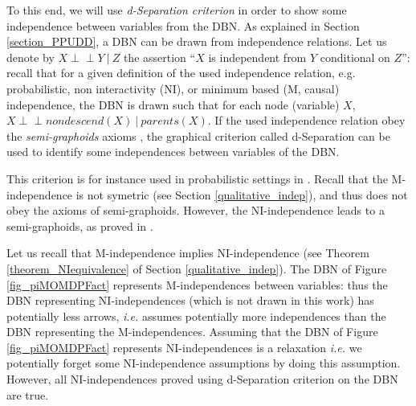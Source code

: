 To this end, we will use \textit{d-Separation criterion} \cite{pearl88} 
in order to show some independence between variables from the DBN.
As explained in Section \ref{section_PPUDD}, 
a DBN can be drawn from independence relations.
Let us denote by $X \perp\!\!\!\perp Y \ \vert \ Z$
the assertion ``$X$ is independent from $Y$ conditional on $Z$'':
recall that for a given definition of the used independence relation,
e.g. probabilistic, non interactivity (NI), or minimum based (M, causal) independence,
the DBN is drawn such that for each node (variable) $X$,
$X \perp\!\!\!\perp nondescend(X) \ \vert \ parents(X)$.
If the used independence relation obey the \textit{semi-graphoids} axioms \cite{Pearl:1988:PRI:52121,DBLP:journals/corr/abs-1304-2379},
the graphical criterion called d-Separation 
can be used to identify some independences between variables of the DBN.

This criterion is for instance used in probabilistic settings in \cite{Witwicki13icaps}.
Recall that the M-independence is not symetric (see Section \ref{qualitative_indep}),
and thus does not obey the axioms of semi-graphoids.
However, the NI-independence leads to a semi-graphoids,
as proved in \cite{delafonk}.

Let us recall that M-independence implies NI-independence
(see Theorem \ref{theorem_NIequivalence} of Section \ref{qualitative_indep}).
The DBN of Figure \ref{fig_piMOMDPFact}
represents M-independences between variables:
thus the DBN representing NI-independences (which is not drawn in this work) 
has potentially less arrows,
\textit{i.e.} assumes potentially more independences 
than the DBN representing the M-independences.
Assuming that the DBN of Figure \ref{fig_piMOMDPFact} 
represents NI-independences is a relaxation
\textit{i.e.} we potentially forget some NI-independence assumptions
by doing this assumption.
However, all NI-independences proved using d-Separation criterion
on the DBN are true.


